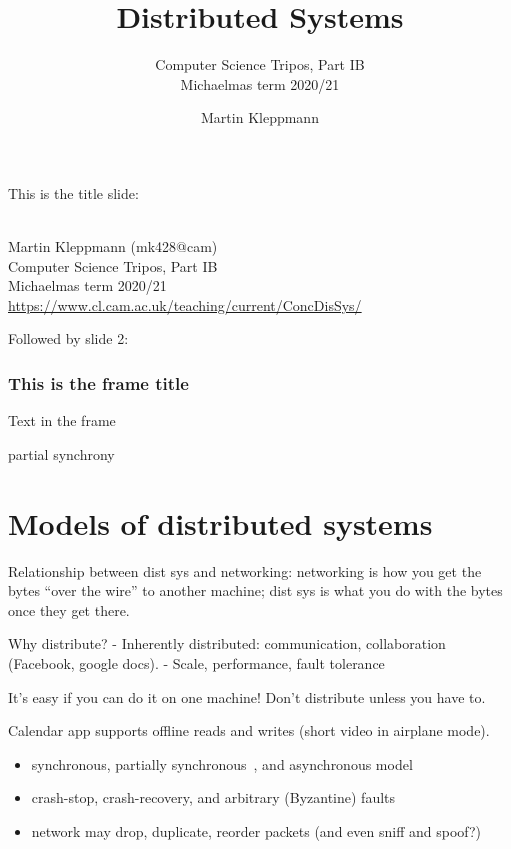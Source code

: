 
\title{Distributed Systems}
\subtitle{Computer Science Tripos, Part IB\\Michaelmas term 2020/21}
\author{Martin Kleppmann}
\date{}
\maketitle

This is the title slide:

\begin{frame}
    \label{s:title}
    \begin{center}
        \textbf{\huge{\color{darkblue}{Distributed Systems}}} \\[2em]
        Martin Kleppmann (mk428@cam) \\[2em]
        Computer Science Tripos, Part IB \\[0.5em]
        Michaelmas term 2020/21 \\[0.5em]
        \url{https://www.cl.cam.ac.uk/teaching/current/ConcDisSys/}
    \end{center}
\end{frame}

Followed by slide 2:

\begin{frame}
    \label{s:test}
    \frametitle{This is the frame title}
    Text in the frame

    partial synchrony
\end{frame}

\section{Models of distributed systems}

Relationship between dist sys and networking: networking is how you get the bytes ``over the wire'' to another machine; dist sys is what you do with the bytes once they get there.

Why distribute?
- Inherently distributed: communication, collaboration (Facebook, google docs).
- Scale, performance, fault tolerance

It's easy if you can do it on one machine! Don't distribute unless you have to. 

Calendar app supports offline reads and writes (short video in airplane mode).

\begin{itemize}
\item synchronous, partially synchronous~\cite{Dwork:1988dr}, and asynchronous model
\item crash-stop, crash-recovery, and arbitrary (Byzantine) faults
\item network may drop, duplicate, reorder packets (and even sniff and spoof?)
\end{itemize}

